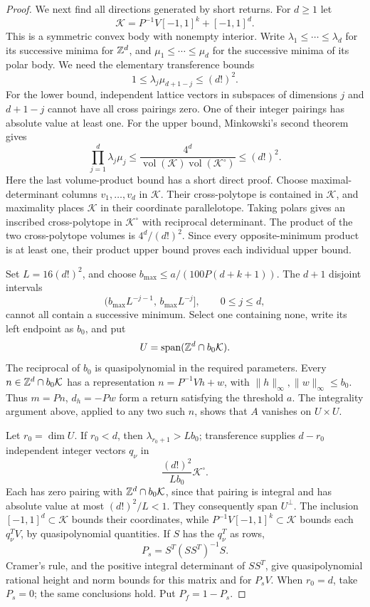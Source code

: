 \begin{proof}
We next find all directions generated by short returns.  For \(d\ge1\)
let
\[
 \mathcal K=P^{-1}V[-1,1]^k+[-1,1]^d.
\]
This is a symmetric convex body with nonempty interior.  Write
\(\lambda_1\le\cdots\le\lambda_d\) for its successive minima for
\(\mathbb Z^d\), and \(\mu_1\le\cdots\le\mu_d\) for the successive minima of
its polar body.  We need the elementary transference bounds
\[
 1\le\lambda_j\mu_{d+1-j}\le(d!)^2 .
\]
For the lower bound, independent lattice vectors in subspaces of
dimensions \(j\) and \(d+1-j\) cannot have all cross pairings zero.
One of their integer pairings has absolute value at least one.
For the upper bound, Minkowski's second theorem
\cite[Theorem~1.3]{Henk2002} gives
\[
 \prod_{j=1}^d\lambda_j\mu_j
 \le\frac{4^d}{\operatorname{vol}(\mathcal K)
                    \operatorname{vol}(\mathcal K^\circ)}
 \le(d!)^2.
\]
Here the last volume-product bound has a short direct proof.
Choose maximal-determinant columns \(v_1,\ldots,v_d\) in \(\mathcal K\).
Their cross-polytope is contained in \(\mathcal K\), and maximality
places \(\mathcal K\) in their coordinate parallelotope.
Taking polars gives an inscribed cross-polytope in
\(\mathcal K^\circ\) with reciprocal determinant.  The product of the
two cross-polytope volumes is \(4^d/(d!)^2\).
Since every opposite-minimum product is at least one, their product
upper bound proves each individual upper bound.

Set \(L=16(d!)^2\), and choose
\(b_{\max}\le a/(100P(d+k+1))\).
The \(d+1\) disjoint intervals
\[
 (b_{\max}L^{-j-1},\,b_{\max}L^{-j}],
 \qquad 0\le j\le d,
\]
cannot all contain a successive minimum.  Select one containing none,
write its left endpoint as \(b_0\), and put
\[
 U=\operatorname{span}(\mathbb Z^d\cap b_0\mathcal K).
\]
The reciprocal of \(b_0\) is quasipolynomial in the required parameters.
Every \(n\in\mathbb Z^d\cap b_0\mathcal K\) has a representation
\(n=P^{-1}Vh+w\), with \(\|h\|_\infty,\|w\|_\infty\le b_0\).
Thus \(m=Pn\), \(d_h=-Pw\) form a return satisfying the threshold \(a\).
The integrality argument above, applied to any two such \(n\), shows
that \(A\) vanishes on \(U\times U\).

Let \(r_0=\dim U\).  If \(r_0<d\), then
\(\lambda_{r_0+1}>Lb_0\); transference supplies \(d-r_0\) independent
integer vectors \(q_\nu\) in
\[
 \frac{(d!)^2}{Lb_0}\mathcal K^\circ .
\]
Each has zero pairing with \(\mathbb Z^d\cap b_0\mathcal K\), since that
pairing is integral and has absolute value at most \((d!)^2/L<1\).
They consequently span \(U^\perp\).  The inclusion
\([-1,1]^d\subset\mathcal K\) bounds their coordinates, while
\(P^{-1}V[-1,1]^k\subset\mathcal K\) bounds each \(q_\nu^TV\),
by quasipolynomial quantities.  If \(S\) has the \(q_\nu^T\) as rows,
\[
 P_s=S^T(SS^T)^{-1}S .
\]
Cramer's rule, and the positive integral determinant of \(SS^T\),
give quasipolynomial rational height and norm bounds for this matrix
and for \(P_sV\).  When \(r_0=d\), take \(P_s=0\); the same conclusions
hold.  Put \(P_f=1-P_s\).


\end{proof}
